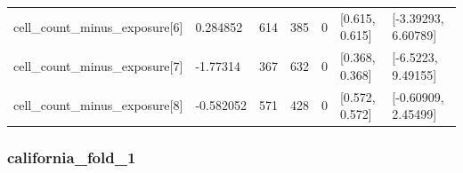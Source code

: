 \begin{longtable}
{}cell\_\allowbreak{}count\_\allowbreak{}minus\_\allowbreak{}exposure[6] & 0.284852 & 614 & 385 & 0 & [0.615, 0.615] & [-3.39293, 6.60789] \\
{}cell\_\allowbreak{}count\_\allowbreak{}minus\_\allowbreak{}exposure[7] & -1.77314 & 367 & 632 & 0 & [0.368, 0.368] & [-6.5223, 9.49155] \\
{}cell\_\allowbreak{}count\_\allowbreak{}minus\_\allowbreak{}exposure[8] & -0.582052 & 571 & 428 & 0 & [0.572, 0.572] & [-0.60909, 2.45499] \\
\end{longtable}\endgroup

\subsubsection{california\_\allowbreak{}fold\_\allowbreak{}1}

